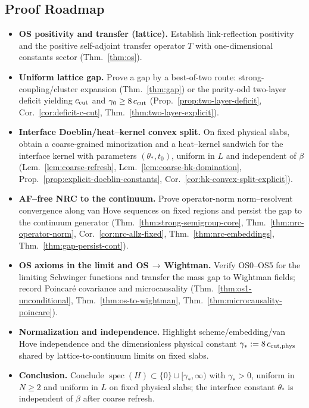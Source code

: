 \documentclass[11pt]{amsart}
\theoremstyle{plain}
\theoremstyle{definition}
\theoremstyle{remark}
\begin{document}
\subsection*{Proof Roadmap}
\begin{itemize}[leftmargin=2em, itemsep=8pt, parsep=4pt]
  \item \textbf{OS positivity and transfer (lattice).} Establish link-reflection positivity and the positive self-adjoint transfer operator $T$ with one-dimensional constants sector (Thm.~\ref{thm:os}).
  \item \textbf{Uniform lattice gap.} Prove a gap by a best-of-two route: strong-coupling/cluster expansion (Thm.~\ref{thm:gap}) or the parity-odd two-layer deficit yielding $c_{\rm cut}$ and $\gamma_0\ge 8\,c_{\rm cut}$ (Prop.~\ref{prop:two-layer-deficit}, Cor.~\ref{cor:deficit-c-cut}, Thm.~\ref{thm:two-layer-explicit}).
\item \textbf{Interface Doeblin/heat--kernel convex split.} On fixed physical slabs, obtain a coarse-grained minorization and a heat--kernel sandwich for the interface kernel with parameters $(\theta_*,t_0)$, uniform in $L$ and independent of $\beta$ (Lem.~\ref{lem:coarse-refresh}, Lem.~\ref{lem:coarse-hk-domination}, Prop.~\ref{prop:explicit-doeblin-constants}, Cor.~\ref{cor:hk-convex-split-explicit}).
\item \textbf{AF--free NRC to the continuum.} Prove operator-norm norm--resolvent convergence along van Hove sequences on fixed regions and persist the gap to the continuum generator (Thm.~\ref{thm:strong-semigroup-core}, Thm.~\ref{thm:nrc-operator-norm}, Cor.~\ref{cor:nrc-allz-fixed}, Thm.~\ref{thm:nrc-embeddings}, Thm.~\ref{thm:gap-persist-cont}).
  \item \textbf{OS axioms in the limit and OS\,$\to$\,Wightman.} Verify OS0--OS5 for the limiting Schwinger functions and transfer the mass gap to Wightman fields; record Poincar\'e covariance and microcausality (Thm.~\ref{thm:os1-unconditional}, Thm.~\ref{thm:os-to-wightman}, Thm.~\ref{thm:microcausality-poincare}).
  \item \textbf{Normalization and independence.} Highlight scheme/embedding/van Hove independence and the dimensionless physical constant $\gamma_*:=8\,c_{\rm cut,phys}$ shared by lattice-to-continuum limits on fixed slabs.
  \item \textbf{Conclusion.} Conclude $\operatorname{spec}(H)\subset\{0\}\cup[\gamma_*,\infty)$ with $\gamma_*>0$, uniform in $N\ge 2$ and uniform in $L$ on fixed physical slabs; the interface constant $\theta_*$ is independent of $\beta$ after coarse refresh.
\end{itemize}
\medskip
\end{document}
